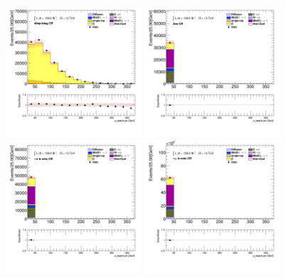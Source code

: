 		\begin{figure}[!htp]
			\begin{center}    
			\includegraphics[width=0.45\textwidth]{chapters/chapter6_HPlus/images/taulep/bjet_0_pt_DILEP_BTAG.png}
			\includegraphics[width=0.45\textwidth]{chapters/chapter6_HPlus/images/taulep/bjet_0_pt_ZEE.png} \\
			\includegraphics[width=0.45\textwidth]{chapters/chapter6_HPlus/images/taulep/bjet_0_pt_TAUEL_BVETO.png} 
			\includegraphics[width=0.45\textwidth]{chapters/chapter6_HPlus/images/taulep/bjet_0_pt_TAUMU_BVETO.png} \\

\end{center}
\end{figure}
